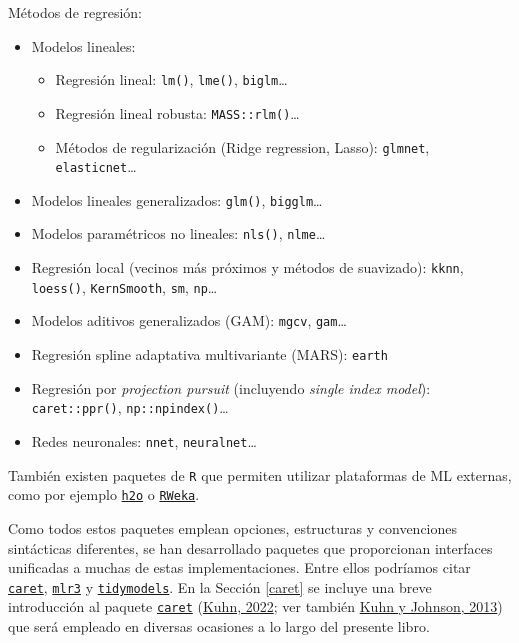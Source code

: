 \documentclass[
]{book}
\theoremstyle{break}
\theoremstyle{nonumberplain}
\begin{document}
Métodos de regresión:

\begin{itemize}
\item
  Modelos lineales:

  \begin{itemize}
  \item
    Regresión lineal: \texttt{lm()}, \texttt{lme()}, \texttt{biglm}\ldots{}
  \item
    Regresión lineal robusta: \texttt{MASS::rlm()}\ldots{}
  \item
    Métodos de regularización (Ridge regression, Lasso): \texttt{glmnet}, \texttt{elasticnet}\ldots{}
  \end{itemize}
\item
  Modelos lineales generalizados: \texttt{glm()}, \texttt{bigglm}\ldots{}
\item
  Modelos paramétricos no lineales: \texttt{nls()}, \texttt{nlme}\ldots{}
\item
  Regresión local (vecinos más próximos y métodos de suavizado): \texttt{kknn}, \texttt{loess()}, \texttt{KernSmooth}, \texttt{sm}, \texttt{np}\ldots{}
\item
  Modelos aditivos generalizados (GAM): \texttt{mgcv}, \texttt{gam}\ldots{}
\item
  Regresión spline adaptativa multivariante (MARS): \texttt{earth}
\item
  Regresión por \emph{projection pursuit} (incluyendo \emph{single index model}): \texttt{caret::ppr()}, \texttt{np::npindex()}\ldots{}
\item
  Redes neuronales: \texttt{nnet}, \texttt{neuralnet}\ldots{}
\end{itemize}

También existen paquetes de \texttt{R} que permiten utilizar plataformas de ML externas, como por ejemplo \href{https://github.com/h2oai/h2o-3/tree/master/h2o-r}{\texttt{h2o}} o \href{https://CRAN.R-project.org/package=RWeka}{\texttt{RWeka}}.

Como todos estos paquetes emplean opciones, estructuras y convenciones sintácticas diferentes, se han desarrollado paquetes que proporcionan interfaces unificadas a muchas de estas implementaciones.
Entre ellos podríamos citar \href{https://topepo.github.io/caret}{\texttt{caret}}, \href{https://mlr3.mlr-org.com}{\texttt{mlr3}} y \href{https://www.tidymodels.org}{\texttt{tidymodels}}.
En la Sección \ref{caret} se incluye una breve introducción al paquete \href{https://topepo.github.io/caret}{\texttt{caret}} (\protect\hyperlink{ref-R-caret}{Kuhn, 2022}; ver también \protect\hyperlink{ref-kuhn2013applied}{Kuhn y Johnson, 2013}) que será empleado en diversas ocasiones a lo largo del presente libro.
\end{document}
